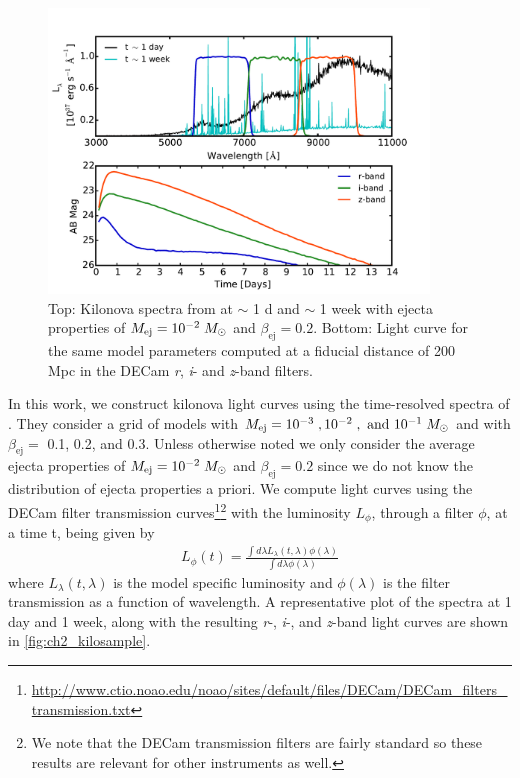 \begin{figure}[t!]
\centering
\includegraphics[width=0.9\textwidth]{./figs/chapter2/ch2_f1.pdf}
\caption{Top: Kilonova spectra from \citet{BarnesKasen13} at $\sim$ 1 d and $\sim$ 1 week with ejecta properties of $M_{\rm ej} =10^{-2}\;M_{\odot}$ and $\beta_{\text{ej}} = 0.2$. Bottom: Light curve for the same model parameters computed at a fiducial distance of 200 Mpc in the DECam {\em r}, {\em i}- and {\em z}-band filters. \vspace{10pt}}
\label{fig:ch2_kilosample}
\end{figure}

In this work, we construct kilonova light curves using the time-resolved spectra of \citet{BarnesKasen13}. They consider a grid of models with $M_{\rm ej} = 10^{-3}\;, 10^{-2} \;, \text{ and } 10^{-1} \;M_{\odot}$ and with $\beta_{\text{ej}} = $ 0.1, 0.2, and 0.3. Unless otherwise noted we only consider the average ejecta properties of $M_{\rm ej} =10^{-2}\;M_{\odot}$ and $\beta_{\text{ej}} = 0.2$ since we do not know the distribution of ejecta properties a priori. We compute light curves using the DECam filter transmission curves\footnote{\url{http://www.ctio.noao.edu/noao/sites/default/files/DECam/DECam_filters_transmission.txt}}\footnote{We note that the DECam transmission filters are fairly standard so these results are relevant for other instruments as well.} with the luminosity $L_{\phi}$, through a filter $\phi$, at a time t, being given by
\begin{align}
\label{eq:LCint}
L_{\phi}(t) = \frac{\int d\lambda L_{\lambda}(t,\lambda) \phi(\lambda)}{\int d\lambda \phi(\lambda)}
\end{align}
\noindent where $L_{\lambda}(t,\lambda)$ is the model specific luminosity and $\phi(\lambda)$ is the filter transmission as a function of wavelength. A representative plot of the spectra at 1 day and 1 week, along with the resulting {\em r}-, {\em i}-, and {\em z}-band light curves are shown in \autoref{fig:ch2_kilosample}.


